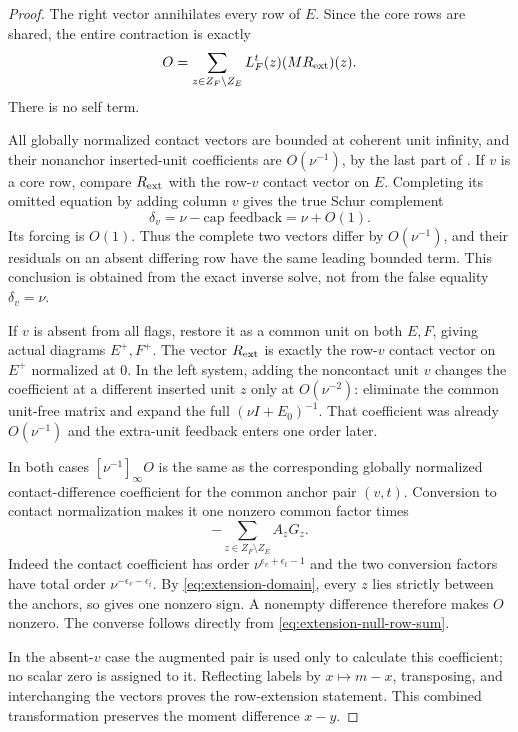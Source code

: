 \documentclass[11pt,a4paper]{amsart}
\numberwithin{equation}{section}
\theoremstyle{plain}
\theoremstyle{definition}
\begin{document}
\begin{proof}
The right vector annihilates every row of \(E\).  Since the core rows are
shared, the entire contraction is exactly
\begin{equation}\label{eq:extension-null-row-sum}
 O=\sum_{z\in Z_F\setminus Z_E}L_F^t(z)(MR_{\rm ext})(z).
\end{equation}
There is no self term.

All globally normalized contact vectors are bounded at coherent unit
infinity, and their nonanchor inserted-unit coefficients are
\(O(\nu^{-1})\), by the last part of .  If \(v\) is a core
row, compare \(R_{\rm ext}\) with the row-\(v\) contact vector on \(E\).
Completing its omitted equation by adding column \(v\) gives the true
Schur complement
\[
 \delta_v=\nu-\text{cap feedback}=\nu+O(1).
\]
Its forcing is \(O(1)\).  Thus the complete two vectors differ by
\(O(\nu^{-1})\), and their residuals on an absent differing row have the
same leading bounded term.  This conclusion is obtained from the exact
inverse solve, not from the false equality \(\delta_v=\nu\).

If \(v\) is absent from all flags, restore it as a common unit on both
\(E,F\), giving actual diagrams \(E^+,F^+\).  The vector \(R_{\rm ext}\) is
exactly the row-\(v\) contact vector on \(E^+\) normalized at \(0\).
In the left system, adding the noncontact unit \(v\) changes the
coefficient at a different inserted unit \(z\) only at \(O(\nu^{-2})\):
eliminate the common unit-free matrix and expand the full
\((\nu I+E_0)^{-1}\).  That coefficient was already \(O(\nu^{-1})\) and the
extra-unit feedback enters one order later.

In both cases \([\nu^{-1}]_\infty O\) is the same as the corresponding globally
normalized contact-difference coefficient for the common anchor pair
\((v,t)\).  Conversion to contact normalization makes it one nonzero common
factor times
\[
 -\sum_{z\in Z_F\setminus Z_E}A_zG_z.
\]
Indeed the contact coefficient has order
\(\nu^{\epsilon_v+\epsilon_t-1}\) and the two conversion factors have total
order \(\nu^{-\epsilon_v-\epsilon_t}\).  By
\eqref{eq:extension-domain}, every \(z\) lies strictly between the anchors,
so  gives one nonzero sign.  A nonempty
difference therefore makes \(O\) nonzero.  The converse follows directly
from \eqref{eq:extension-null-row-sum}.

In the absent-\(v\) case the augmented pair is used only to calculate this
coefficient; no scalar zero is assigned to it.  Reflecting labels by
\(x\mapsto m-x\), transposing, and interchanging the vectors proves the
row-extension statement.  This combined transformation preserves the
moment difference \(x-y\).
\end{proof}
\end{document}
